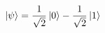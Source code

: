 \documentclass[preview]{standalone}
\begin{document}
\begin{align*}
\ket{\psi} = \frac{1}{\sqrt{2}} \ket{0} - \frac{1}{\sqrt{2}} \ket{1}
\end{align*}
\end{document}
